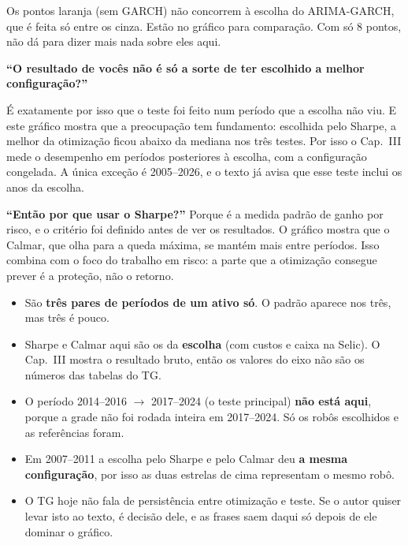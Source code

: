 \documentclass[11pt,a4paper]{article}
\begin{document}
Os pontos laranja (sem GARCH) não concorrem à escolha do ARIMA-GARCH, que é feita só entre os cinza. Estão no
gráfico para comparação. Com só 8 pontos, não dá para dizer mais nada sobre eles aqui.

\begin{banca}
\textbf{``O resultado de vocês não é só a sorte de ter escolhido a melhor configuração?''}

É exatamente por isso que o teste foi feito num período que a escolha não viu. E este gráfico mostra que a
preocupação tem fundamento: escolhida pelo Sharpe, a melhor da otimização ficou abaixo da mediana nos três testes.
Por isso o Cap.~III mede o desempenho em períodos posteriores à escolha, com a configuração congelada. A única
exceção é 2005--2026, e o texto já avisa que esse teste inclui os anos da escolha.

\textbf{``Então por que usar o Sharpe?''} Porque é a medida padrão de ganho por risco, e o critério foi
definido antes de ver os resultados. O gráfico mostra que o Calmar, que olha para a queda máxima, se mantém mais
entre períodos. Isso combina com o foco do trabalho em risco: a parte que a otimização consegue prever é a
proteção, não o retorno.
\end{banca}

\begin{cuidado}
\begin{itemize}\setlength\itemsep{1pt}
  \item São \textbf{três pares de períodos de um ativo só}. O padrão aparece nos três, mas três é pouco.
  \item Sharpe e Calmar aqui são os da \textbf{escolha} (com custos e caixa na Selic). O Cap.~III mostra o
        resultado bruto, então os valores do eixo não são os números das tabelas do TG.
  \item O período 2014--2016 $\to$ 2017--2024 (o teste principal) \textbf{não está aqui}, porque a grade não foi
        rodada inteira em 2017--2024. Só os robôs escolhidos e as referências foram.
  \item Em 2007--2011 a escolha pelo Sharpe e pelo Calmar deu \textbf{a mesma configuração}, por isso as duas
        estrelas de cima representam o mesmo robô.
  \item O TG hoje não fala de persistência entre otimização e teste. Se o autor quiser levar isto ao texto, é
        decisão dele, e as frases saem daqui só depois de ele dominar o gráfico.
\end{itemize}
\end{cuidado}
\end{document}
